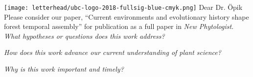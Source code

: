 \documentclass[11pt,a4paper]{article}
\begin{document}

\noindent \texttt{[image: letterhead/ubc-logo-2018-fullsig-blue-cmyk.png]}
\noindent Dear Dr. Öpik
\vspace{1.5ex}\\
\noindent Please consider our paper, ``Current environments and evolutionary history shape forest temporal assembly'' for publication as a full paper in \emph{New Phytologist}. 
\vspace{1.5ex}\\ 
\noindent \textit{What hypotheses or questions does this work address?} %

\noindent \textit{How does this work advance our current understanding of plant science?}

\noindent \textit{Why is this work important and timely?}
\end{document}
